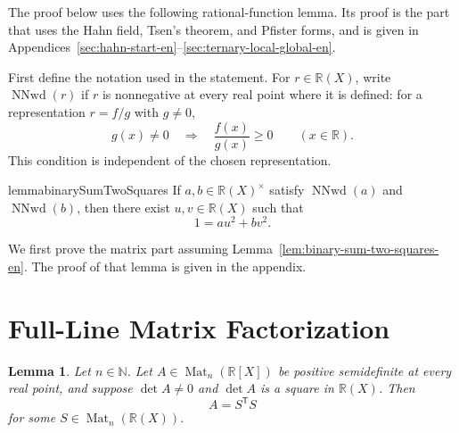 \documentclass[uplatex,dvipdfmx]{jsarticle}
\newcommand{\Poly}{\mathbb{R}[X]}
\newcommand{\Frac}{\mathbb{R}(X)}
\newcommand{\Mat}{\operatorname{Mat}}
\newcommand{\NNwd}{\operatorname{NNwd}}
\theoremstyle{matrixsosdefinition}
\newtheorem{lemma}[theorem]{Lemma}
\begin{document}
The proof below uses the following rational-function lemma.  Its proof is the
part that uses the Hahn field, Tsen's theorem, and Pfister forms, and is given
in Appendices~\ref{sec:hahn-start-en}--\ref{sec:ternary-local-global-en}.

First define the notation used in the statement.  For \(r\in\Frac\), write
\(\NNwd(r)\) if \(r\) is nonnegative at every real point where it is defined:
for a representation \(r=f/g\) with \(g\ne0\),
\[
  g(x)\ne0 \quad\Longrightarrow\quad \frac{f(x)}{g(x)}\ge0
  \qquad (x\in\mathbb{R}).
\]
This condition is independent of the chosen representation.

\begin{restatable}{lemma}{binarySumTwoSquares}
\label{lem:binary-sum-two-squares-en}
  If \(a,b\in\Frac^\times\) satisfy \(\NNwd(a)\) and \(\NNwd(b)\), then
  there exist \(u,v\in\Frac\) such that
  \[
    1=au^2+bv^2.
  \]
\end{restatable}

We first prove the matrix part assuming
Lemma~\ref{lem:binary-sum-two-squares-en}.  The proof of that lemma is given in
the appendix.

\section{Full-Line Matrix Factorization}\label{sec:matrix-factorization-en}

\begin{lemma}\label{lem:rational-square-factorization-en}
  Let \(n\in\mathbb{N}\). Let \(A\in\Mat_n(\Poly)\) be positive semidefinite at
  every real point, and suppose \(\det A\ne0\) and \(\det A\) is a square in
  \(\Frac\). Then
  \[
    A=S^{\mathsf T}S
  \]
  for some \(S\in\Mat_n(\Frac)\).
\end{lemma}
\end{document}
